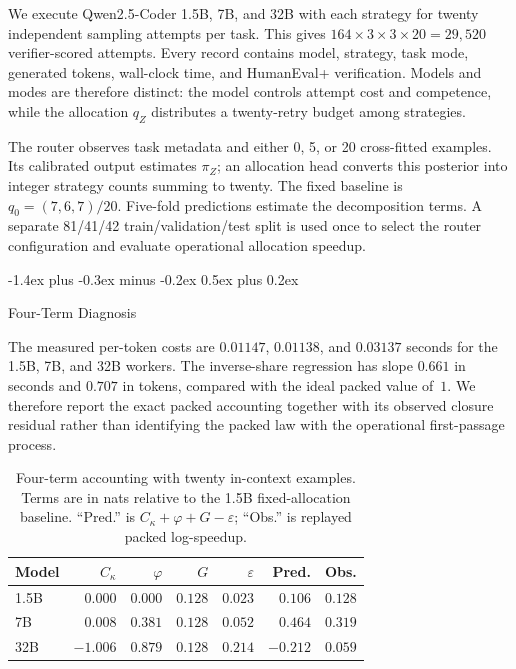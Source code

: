 \documentclass[10pt,twocolumn]{article}
\makeatletter
\theoremstyle{paperplain}
\theoremstyle{paperdefinition}
\theoremstyle{paperremark}
\renewcommand{\subsection}{%
  \@startsection{subsection}{2}{\z@}%
    {-1.4ex plus -0.3ex minus -0.2ex}%
    {0.5ex plus 0.2ex}%
    {\normalfont\normalsize\bfseries\raggedright}}
\makeatother
\begin{document}
We execute Qwen2.5-Coder 1.5B, 7B, and 32B with each strategy for twenty
independent sampling attempts per task.  This gives
$164\times3\times3\times20=29{,}520$ verifier-scored attempts.  Every record
contains model, strategy, task mode, generated tokens, wall-clock time, and
HumanEval+ verification.  Models and modes are therefore distinct: the model
controls attempt cost and competence, while the allocation $q_Z$ distributes a
twenty-retry budget among strategies.

The router observes task metadata and either 0, 5, or 20 cross-fitted examples.
Its calibrated output estimates $\pi_Z$; an allocation head converts this
posterior into integer strategy counts summing to twenty.  The fixed baseline
is $q_0=(7,6,7)/20$.  Five-fold predictions estimate the decomposition terms.
A separate 81/41/42 train/validation/test split is used once to select the
router configuration and evaluate operational allocation speedup.

\subsection{Four-Term Diagnosis}

The measured per-token costs are $0.01147$, $0.01138$, and $0.03137$ seconds
for the 1.5B, 7B, and 32B workers.  The inverse-share regression has slope
$0.661$ in seconds and $0.707$ in tokens, compared with the ideal packed value
of~$1$.  We therefore report the exact packed accounting together with its
observed closure residual rather than identifying the packed law with the
operational first-passage process.

\begin{table}[t]
\centering
\small
\caption{Four-term accounting with twenty in-context examples.  Terms are in
nats relative to the 1.5B fixed-allocation baseline.  ``Pred.'' is
$C_\kappa+\varphi+G-\varepsilon$; ``Obs.'' is replayed packed log-speedup.}
\label{tab:four-term-accounting}
\begin{tabular}{@{}lrrrrrr@{}}
\toprule
Model & $C_\kappa$ & $\varphi$ & $G$ & $\varepsilon$ & Pred. & Obs. \\
\midrule
1.5B & $0.000$ & $0.000$ & $0.128$ & $0.023$ & $0.106$ & $0.128$ \\
7B   & $0.008$ & $0.381$ & $0.128$ & $0.052$ & $0.464$ & $0.319$ \\
32B  & $-1.006$ & $0.879$ & $0.128$ & $0.214$ & $-0.212$ & $0.059$ \\
\bottomrule
\end{tabular}
\end{table}
\end{document}
